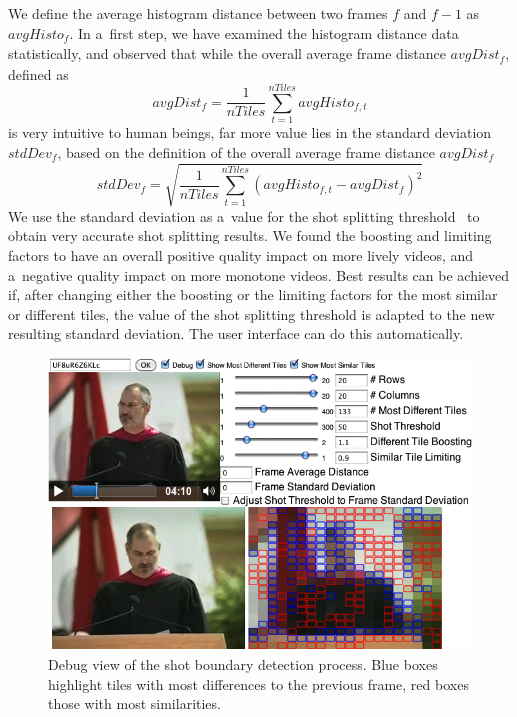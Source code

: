 We define the average histogram distance between two frames
$\mathit{f}$ and $\mathit{f - 1}$ as $\mathit{avgHisto_{f}}$.
In a~first step, we have examined the histogram distance
data statistically, and observed that while
the overall average frame distance $\mathit{avgDist_{f}}$,
defined as $$\mathit{avgDist_{f}} =
\frac{1}{\mathit{nTiles}}\sum_{t=1}^{\mathit{nTiles}}
\mathit{avgHisto_{f, t}}$$ is very intuitive to human beings,
far more value lies in the standard deviation
$\mathit{stdDev_{f}}$, based on the definition of the overall
average frame distance $\mathit{avgDist_{f}}$
$$\mathit{stdDev_{f}} =
\sqrt{\frac{1}{\mathit{nTiles}}\sum_{t=1}^{\mathit{nTiles}}
(\mathit{avgHisto_{f, t}} - \mathit{avgDist_{f}})^{2}}$$
We use the standard deviation as a~value for the shot splitting
threshold~\cite{lienhart1999comparison}
to obtain very accurate shot splitting results.
We found the boosting and limiting factors to have an overall
positive quality impact on more lively videos,
and a~negative quality impact on more monotone videos.
Best results can be achieved if,
after changing either the boosting or the limiting factors
for the most similar or different tiles,
the value of the shot splitting threshold is adapted
to the new resulting standard deviation.
The user interface can do this automatically.

\begin{figure}
\centering
    \includegraphics[width=1.0\linewidth]{./algorithm.png}
  \caption[Debug view of the shot boundary detection process]
    {Debug view of the shot boundary detection process.
    Blue boxes highlight tiles with most differences
    to the previous frame, red boxes those with most similarities.}
  \label{fig:algorithm}
\end{figure}

